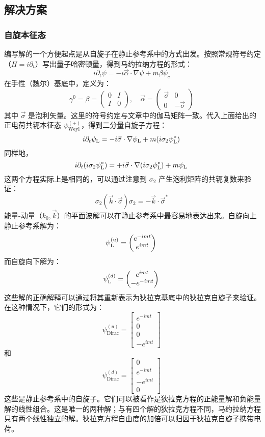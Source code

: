 \subsection{解决方案}  
\subsubsection{自旋本征态}  
编写解的一个方便起点是从自旋子在静止参考系中的方式出发。按照常规符号约定（\( H = i \partial_t \)）写出量子哈密顿量，得到马约拉纳方程的形式：
\[
i \partial_t \psi = -i \vec{\alpha} \cdot \nabla \psi + m \beta \psi_c~
\]
在手性（魏尔）基底中，定义为：
\[
\gamma^0 = \beta = \begin{pmatrix} 0 & I \\ I & 0 \end{pmatrix}, \quad \vec{\alpha} = \begin{pmatrix} \vec{\sigma} & 0 \\ 0 & -\vec{\sigma} \end{pmatrix}~
\]
其中 \(\vec{\sigma}\) 是泡利矢量。这里的符号约定与文章中的伽马矩阵一致。代入上面给出的正电荷共轭本征态 \( \psi_{\text{Weyl}}^{(+)} \)，得到二分量自旋子方程：
\[
i \partial_t \psi_{\rm L} = -i \vec{\sigma} \cdot \nabla \psi_{\rm L} + m (i \sigma_2 \psi_{\rm L}^*)~
\]
同样地，
\[
i \partial_t (i \sigma_2 \psi_{\rm L}^*) = +i \vec{\sigma} \cdot \nabla (i \sigma_2 \psi_{\rm L}^*) + m \psi_{\rm L}~
\]
这两个方程实际上是相同的，可以通过注意到 \( \sigma_2 \) 产生泡利矩阵的共轭复数来验证：
\[
\sigma_2 (\vec{k} \cdot \vec{\sigma}) \sigma_2 = -\vec{k} \cdot \vec{\sigma}^*~
\]
能量-动量（\(k_0, \vec{k}\)）的平面波解可以在静止参考系中最容易地表达出来。自旋向上静止参考系解为：
\[
\psi_{\rm L}^{(u)} = \begin{pmatrix} e^{-imt} \\ e^{imt} \end{pmatrix}~
\]
而自旋向下解为：
\[
\psi_{\rm L}^{(d)} = \begin{pmatrix} e^{imt} \\ -e^{-imt} \end{pmatrix}~
\]
这些解的正确解释可以通过将其重新表示为狄拉克基底中的狄拉克自旋子来验证。在这种情况下，它们的形式为：
\[
\psi_{\text{Dirac}}^{(u)} = \begin{bmatrix} e^{-imt} \\ 0 \\ 0 \\ -e^{imt} \end{bmatrix}~
\]
和
\[
\psi_{\text{Dirac}}^{(d)} = \begin{bmatrix} 0 \\ e^{-imt} \\ -e^{imt} \\ 0 \end{bmatrix}~
\]
这些是静止参考系中的自旋子。它们可以被看作是狄拉克方程的正能量解和负能量解的线性组合。这是唯一的两种解；与有四个解的狄拉克方程不同，马约拉纳方程只有两个线性独立的解。狄拉克方程自由度的加倍可以归因于狄拉克自旋子携带电荷。